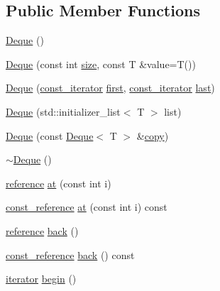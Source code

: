 \subsection*{Public Member Functions}
\begin{DoxyCompactItemize}
\item 
\hyperlink{classprism_1_1_deque_ae8fcffd4a0cf7dba0e33a6983641efc2}{Deque} ()
\item 
\hyperlink{classprism_1_1_deque_ac73ef5f071e6dfddf1f5e8a123752d3e}{Deque} (const int \hyperlink{classprism_1_1_deque_a38e141650506c5b320093c5bd5486a8c}{size}, const T \&value=T())
\item 
\hyperlink{classprism_1_1_deque_a0b6d151a459f2170caac7d120b22c4c9}{Deque} (\hyperlink{classprism_1_1_deque_afc2f71fd5b01e963e093f64cc4da94ec}{const\+\_\+iterator} \hyperlink{classprism_1_1_deque_a9b4c76aae18b2d465f6e066fa3262cc4}{first}, \hyperlink{classprism_1_1_deque_afc2f71fd5b01e963e093f64cc4da94ec}{const\+\_\+iterator} \hyperlink{classprism_1_1_deque_a9ca3d5be5c2e941af1a14c1383063ae7}{last})
\item 
\hyperlink{classprism_1_1_deque_aa8c11433e26904fb8a46b912ea6617cf}{Deque} (std\+::initializer\+\_\+list$<$ T $>$ list)
\item 
\hyperlink{classprism_1_1_deque_abaa7ff51e27ef7acb0ca1afe523e7976}{Deque} (const \hyperlink{classprism_1_1_deque}{Deque}$<$ T $>$ \&\hyperlink{namespaceprism_ae776f4cd825f79e7af1cf6ee1d90a209}{copy})
\item 
\hyperlink{classprism_1_1_deque_a2a06b6247712d843c6f23df8ba807ca7}{$\sim$\+Deque} ()
\item 
\hyperlink{classprism_1_1_deque_a93d8792e719ca205ce1b9ed5d8207c1d}{reference} \hyperlink{classprism_1_1_deque_a65c32d16eb2134a702c753f105de9d97}{at} (const int i)
\item 
\hyperlink{classprism_1_1_deque_a8fcabfe6976606b91b4abef0e0353584}{const\+\_\+reference} \hyperlink{classprism_1_1_deque_a4fc2c88d257f52f95232639808f41c36}{at} (const int i) const 
\item 
\hyperlink{classprism_1_1_deque_a93d8792e719ca205ce1b9ed5d8207c1d}{reference} \hyperlink{classprism_1_1_deque_a3b2d94aaa26559418ca55084b2ebfe41}{back} ()
\item 
\hyperlink{classprism_1_1_deque_a8fcabfe6976606b91b4abef0e0353584}{const\+\_\+reference} \hyperlink{classprism_1_1_deque_a8bac1935776aec89723775807f022ef1}{back} () const 
\item 
\hyperlink{classprism_1_1_deque_af6fbdfa6e826f7f71b29f4d3cfb72ed1}{iterator} \hyperlink{classprism_1_1_deque_a8d0711ff8a7e810cad9b535c79b7f9b7}{begin} ()

\end{DoxyCompactItemize}
